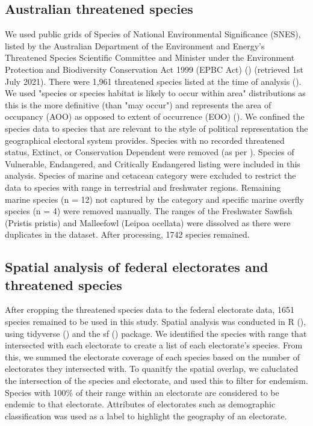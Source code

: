 \documentclass[a4paper,11pt]{article}
\begin{document}
\subsection{Australian threatened species}

We used public grids of Species of National Environmental Significance (SNES), listed by the Australian Department of the Environment and Energy’s Threatened Species Scientific Committee and Minister under the Environment Protection and Biodiversity Conservation Act 1999 (EPBC Act) (\cite{commonwealthofaustraliaThreatenedSpeciesEPBC2021}) (retrieved 1st July 2021). There were 1,961 threatened species listed at the time of analysis (\cite{commonwealthofaustraliaThreatenedSpeciesEPBC2021}). We used "species or species habitat is likely to occur within area" distributions as this is the more definitive (than "may occur") and represents the area of occupancy (AOO) as opposed to extent of occurrence (EOO) (\cite{gastonSizesSpeciesGeographic2009, lloydEstimatingSpatialCoverage2020}). We confined the species data to species that are relevant to the style of political representation the geographical electoral system provides. Species with no recorded threatened status, Extinct, or Conservation Dependent were removed (as per \cite{wardNationalscaleDatasetThreats}). Species of Vulnerable, Endangered, and Critically Endangered listing were included in this analysis. Species of marine and cetacean category were excluded to restrict the data to species with range in terrestrial and freshwater regions. Remaining marine species (n = 12) not captured by the category and specific marine overfly species (n = 4) were removed manually. The ranges of the Freshwater Sawfish (Pristis pristis) and Malleefowl (Leipoa ocellata) were dissolved as there were duplicates in the dataset. After processing, 1742 species remained.

\subsection{Spatial analysis of federal electorates and threatened species}

After cropping the threatened species data to the federal electorate data, 1651 species remained to be used in this study. Spatial analysis was conducted in R (\cite{rcoreteamLanguageEnvironmentStatistical2021}), using tidyverse (\cite{wickhamWelcomeTidyverse2019}) and the sf (\cite{pebesmaSimpleFeaturesStandardized2018}) package. We identified the species with range that intersected with each electorate to create a list of each electorate's species. From this, we summed the electorate coverage of each species based on the number of electorates they intersected with. To quanitfy the spatial overlap, we caluclated the intersection of the species and electorate, and used this to filter for endemism. Species with 100\% of their range within an electorate are considered to be endemic to that electorate. Attributes of electorates such as demographic classification was used as a label to highlight the geography of an electorate.
\end{document}
